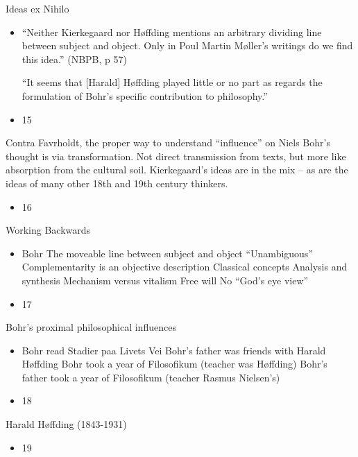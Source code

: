 \documentclass{beamer}
\begin{document}
\begin{frame}{Ideas ex Nihilo}
\begin{itemize}
  \item “Neither Kierkegaard nor Høffding mentions an arbitrary dividing line between subject and object. Only in Poul Martin Møller’s writings do we find this idea.” (NBPB, p 57)

“It seems that [Harald] Høffding played little or no part as regards the formulation of Bohr's specific contribution to philosophy.”
  \item 15
\end{itemize}
\end{frame}
\begin{frame}{Contra Favrholdt, the proper way to understand “influence” on Niels Bohr’s thought is via transformation.
Not direct transmission from texts, but more like absorption from the cultural soil.
Kierkegaard’s ideas are in the mix – as are the ideas of many other 18th and 19th century thinkers.}
\begin{itemize}
  \item 16
\end{itemize}
\end{frame}
\begin{frame}{Working Backwards}
\begin{itemize}
  \item Bohr
The moveable line between subject and object 
“Unambiguous”
Complementarity is an objective description
Classical concepts 
Analysis and synthesis
Mechanism versus vitalism
Free will 
No “God’s eye view”
  \item 17
\end{itemize}
\end{frame}
\begin{frame}{Bohr’s proximal philosophical influences}
\begin{itemize}
  \item Bohr read Stadier paa Livets Vei
Bohr’s father was friends with Harald Høffding
Bohr took a year of Filosofikum (teacher was Høffding)
Bohr’s father took a year of Filosofikum (teacher Rasmus Nielsen’s)
  \item 18
\end{itemize}
\end{frame}
\begin{frame}{Harald Høffding (1843-1931)}
\begin{itemize}
  \item 19
\end{itemize}
\end{frame}
\end{document}
